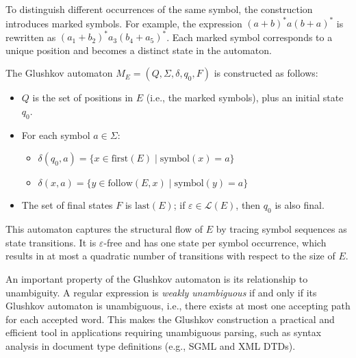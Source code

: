 To distinguish different occurrences of the same symbol, the construction introduces marked symbols. For example, the expression $(a + b)^*a(b + a)^*$ is rewritten as $(a_1 + b_2)^*a_3(b_4 + a_5)^*$. Each marked symbol corresponds to a unique position and becomes a distinct state in the automaton.

The Glushkov automaton $M_E = (Q, \Sigma, \delta, q_0, F)$ is constructed as follows:

\begin{itemize}
    \item $Q$ is the set of positions in $E$ (i.e., the marked symbols), plus an initial state $q_0$.
    \item For each symbol $a \in \Sigma$:
    \begin{itemize}
        \item $\delta(q_0, a) = \{ x \in \text{first}(E) \mid \text{symbol}(x) = a \}$
        \item $\delta(x, a) = \{ y \in \text{follow}(E, x) \mid \text{symbol}(y) = a \}$
    \end{itemize}
    \item The set of final states $F$ is $\text{last}(E)$; if $\varepsilon \in \mathcal{L}(E)$, then $q_0$ is also final.
\end{itemize}

This automaton captures the structural flow of $E$ by tracing symbol sequences as state transitions. It is $\varepsilon$-free and has one state per symbol occurrence, which results in at most a quadratic number of transitions with respect to the size of $E$.

An important property of the Glushkov automaton is its relationship to unambiguity. A regular expression is \emph{weakly unambiguous} if and only if its Glushkov automaton is unambiguous, i.e., there exists at most one accepting path for each accepted word. This makes the Glushkov construction a practical and efficient tool in applications requiring unambiguous parsing, such as syntax analysis in document type definitions (e.g., SGML and XML DTDs).





